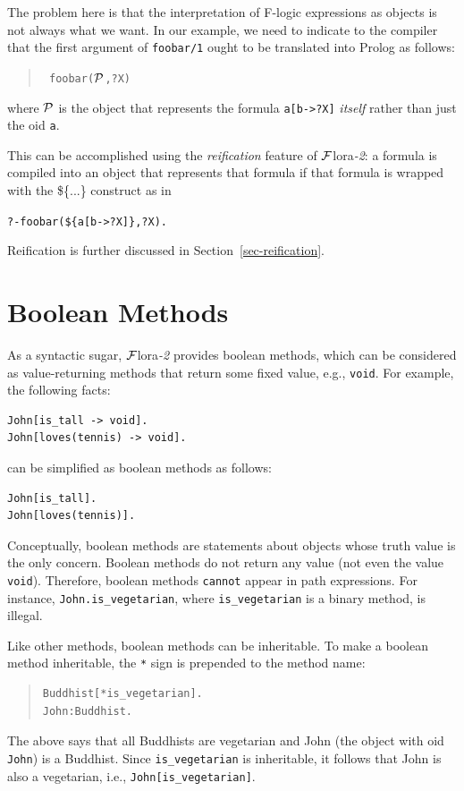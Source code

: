 \documentclass[11pt]{article}
\newcommand{\FLORA}{{\mbox{\sc ${\cal F}${lora}\rm\emph{-2}}}\xspace}
\newcommand{\fl}{\mbox{F-logic}\xspace}
\begin{document}
The problem here is that the interpretation of \fl expressions as
objects is not always what we want. In our example, we need to indicate to the
compiler that the first argument of {\tt foobar/1} ought to be translated
into Prolog as follows:
\begin{quote}
 \tt
 foobar($\cal P$,?X)
\end{quote}
where $\cal P$ is the object that represents
the formula {\tt a[b->?X]} \emph{itself} rather than just
the oid {\tt a}.

This can be accomplished using the \emph{reification} feature of
\FLORA: a formula is compiled into an object that represents that formula if
that formula is wrapped with the \$\{...\} construct as in
\begin{alltt}
 ?- foobar(\$\{a[b->?X]\}, ?X).
\end{alltt}
Reification is further discussed in Section~\ref{sec-reification}.



\section{Boolean Methods}


As a syntactic sugar, \FLORA provides boolean methods, which can be
considered as value-returning methods that return some fixed value, e.g.,
{\tt void}. For example, the following facts:
\begin{verbatim}
John[is_tall -> void].
John[loves(tennis) -> void].
\end{verbatim}
can be simplified as boolean methods as follows:
\begin{verbatim}
John[is_tall].
John[loves(tennis)].
\end{verbatim}

Conceptually, boolean methods are statements about objects whose truth
value is the only concern. Boolean methods do not return any value (not
even the value {\tt void}). Therefore, boolean methods {\tt cannot} appear
in path expressions. For instance, \mbox{\tt John.is\_vegetarian}, where
{\tt is\_vegetarian} is a binary method, is illegal.

Like other methods, boolean methods can be inheritable. To make a
boolean method inheritable, the \verb|*| sign is prepended to
the method name:
\begin{quote}
\begin{verbatim}
Buddhist[*is_vegetarian].
John:Buddhist.
\end{verbatim}
\end{quote}
The above says that all Buddhists are vegetarian and John (the object with
oid {\tt John}) is a Buddhist. Since \verb|is_vegetarian| is inheritable,
it follows that John is also a vegetarian, i.e.,
\verb|John[is_vegetarian]|.
\end{document}
